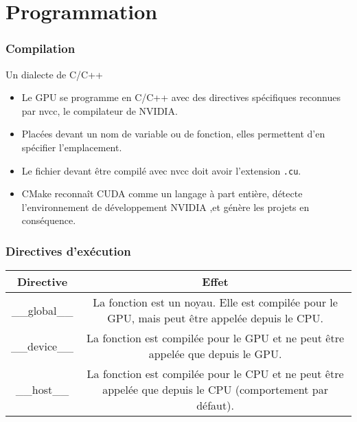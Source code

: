 \section{Programmation}
\begin{frame}
    \frametitle{Compilation}
\begin{block}{Un dialecte de C/C++}
    \begin{itemize}
        \item<+-> Le GPU se programme en C/C++ avec des directives spécifiques reconnues par nvcc, le 
        compilateur de NVIDIA.
        \item<+-> Placées devant un nom de variable ou de fonction, elles permettent d'en spécifier l'emplacement.
        \item<+-> Le fichier devant être compilé avec nvcc doit avoir l'extension \texttt{.cu}.
        \item<+-> CMake reconnaît CUDA comme un langage à part entière, détecte l'environnement de développement NVIDIA
        ,et génère les projets en conséquence.
    \end{itemize}
\end{block}
\end{frame}
\begin{frame}
    \frametitle{Directives d'exécution}
    \renewcommand{\arraystretch}{2}
    \vskip 20pt
    \begin{tabular}{|c|c|}
        \hline
        \rowcolor{lightgray} Directive & Effet \\ \hline
        \_\_global\_\_ & \begin{minipage}{0.8\textwidth}
            La fonction est un noyau. Elle est compilée pour le GPU, mais peut être appelée depuis le CPU. 
        \end{minipage} \\ \hline
        \_\_device\_\_ & \begin{minipage}{0.8\textwidth}
            La fonction est compilée pour le GPU et ne peut être appelée que depuis le GPU. 
        \end{minipage} \\ \hline
        \_\_host\_\_ & \begin{minipage}{0.8\textwidth}
            La fonction est compilée pour le CPU et ne peut être appelée que depuis le CPU (comportement par défaut). 
        \end{minipage} \\ \hline
    \end{tabular}

\end{frame}
